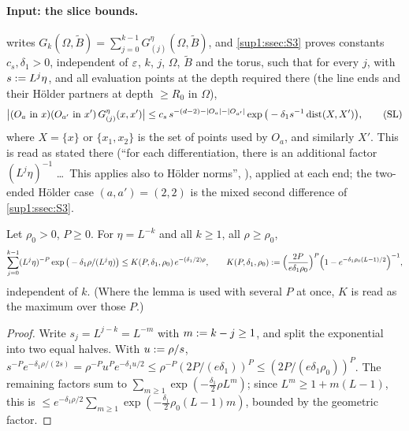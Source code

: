 \paragraph{Input: the slice bounds.} \cite[(2.6)]{Ba3} writes $G_k(\Omega,\tilde B)=\sum_{j=0}^{k-1}G^\eta_{(j)}(\Omega,\tilde B)$, and \cref{sup1:ssec:S3} proves constants $c_s,\delta_1>0$, independent of $\varepsilon$, $k$, $j$, $\Omega$, $\tilde B$ and the torus, such that for every $j$, with $s:= L^j\eta$, and all evaluation points at the depth required there (the line ends and their H\"older partners at depth $\ge R_0$ in $\Omega$),
\begin{equation}\label{sup2:eq:SL}
\big|(O_a\text{ in }x)(O_{a'}\text{ in }x')\,G^\eta_{(j)}(x,x')\big|\le c_s\,s^{-(d-2)-|O_a|-|O_{a'}|}\exp\big(-\delta_1s^{-1}\operatorname{dist}(X,X')\big),\tag{SL}
\end{equation}
where $X=\{x\}$ or $\{x_1,x_2\}$ is the set of points used by $O_a$, and similarly $X'$. This is \cite[(2.10)--(2.11)]{Ba3} read as stated there (``for each differentiation, there is an additional factor $(L^j\eta)^{-1}$ \dots\ This applies also to H\"older norms'', \cite[p.~426]{Ba3}), applied at each end; the two-ended H\"older case $(a,a')=(2,2)$ is the mixed second difference of \cref{sup1:ssec:S3}.

\begin{lemma}\label{sup2:lem:S9sum}
Let $\rho_0>0$, $P\ge0$. For $\eta=L^{-k}$ and all $k\ge1$, all $\rho\ge\rho_0$,
\[
\sum_{j=0}^{k-1}(L^j\eta)^{-P}\exp\big(-\delta_1\rho/(L^j\eta)\big)\le K(P,\delta_1,\rho_0)\,e^{-(\delta_1/2)\rho},\qquad K(P,\delta_1,\rho_0):=\Big(\frac{2P}{e\delta_1\rho_0}\Big)^P\Big(1-e^{-\delta_1\rho_0(L-1)/2}\Big)^{-1},
\]
independent of $k$. (Where the lemma is used with several $P$ at once, $K$ is read as the maximum over those $P$.)
\end{lemma}

\begin{proof}
Write $s_j=L^{j-k}=L^{-m}$ with $m:= k-j\ge1$, and split the exponential into two equal halves. With $u:=\rho/s$, $s^{-P}e^{-\delta_1\rho/(2s)}=\rho^{-P}u^Pe^{-\delta_1u/2}\le\rho^{-P}(2P/(e\delta_1))^P\le(2P/(e\delta_1\rho_0))^P$. The remaining factors sum to $\sum_{m\ge1}\exp(-\frac{\delta_1}2\rho L^m)$; since $L^m\ge1+m(L-1)$, this is $\le e^{-\delta_1\rho/2}\sum_{m\ge1}\exp(-\frac{\delta_1}2\rho_0(L-1)m)$, bounded by the geometric factor.
\end{proof}

